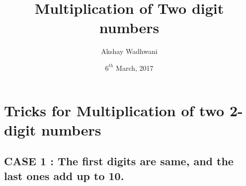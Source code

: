 \documentclass[11pt]{article}
\title{Multiplication of Two digit numbers}
\author{Akshay Wadhwani}
\date{$6^{th}$ March, 2017}
\begin{document}
\begin{titlepage}
\maketitle
 \begin{center}
        \vspace{0.8cm}
  \end{center}      
\end{titlepage}
\tableofcontents
\newpage
\section{Tricks for Multiplication of two 2-digit numbers}
\subsection{CASE 1 : The first digits are same, and the last ones add up to 10.}
\end{document}
